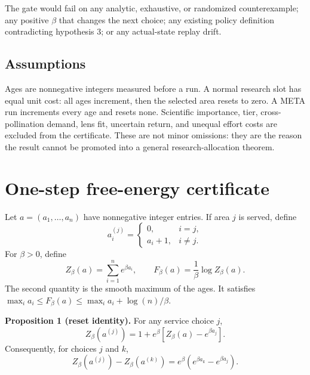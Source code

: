 \documentclass[10pt]{article}
\begin{document}
The gate would fail on any analytic, exhaustive, or randomized counterexample;
any positive $\beta$ that changes the next choice; any existing policy
definition contradicting hypothesis 3; or any actual-state replay drift.

\subsection{Assumptions}

Ages are nonnegative integers measured before a run.  A normal research slot has
equal unit cost: all ages increment, then the selected area resets to zero.  A
META run increments every age and resets none.  Scientific importance, tier,
cross-pollination demand, lens fit, uncertain return, and unequal effort costs
are excluded from the certificate.  These are not minor omissions: they are the
reason the result cannot be promoted into a general research-allocation theorem.

\section{One-step free-energy certificate}

Let $a=(a_1,\ldots,a_n)$ have nonnegative integer entries.  If area $j$ is served, define
\begin{equation}
a_i^{(j)}=\begin{cases}0,&i=j,\\a_i+1,&i\ne j.\end{cases}
\label{eq:transition}
\end{equation}
For $\beta>0$, define
\begin{equation}
Z_\beta(a)=\sum_{i=1}^n e^{\beta a_i},\qquad
F_\beta(a)=\frac{1}{\beta}\log Z_\beta(a).
\label{eq:free}
\end{equation}
The second quantity is the smooth maximum of the ages.  It satisfies
$\max_i a_i\le F_\beta(a)\le\max_i a_i+\log(n)/\beta$.

\textbf{Proposition 1 (reset identity).}
For any service choice $j$,
\begin{equation}
Z_\beta(a^{(j)})
=1+e^\beta\left[Z_\beta(a)-e^{\beta a_j}\right].
\label{eq:reset}
\end{equation}
Consequently, for choices $j$ and $k$,
\begin{equation}
Z_\beta(a^{(j)})-Z_\beta(a^{(k)})
=e^\beta\left(e^{\beta a_k}-e^{\beta a_j}\right).
\label{eq:gap}
\end{equation}
\end{document}
